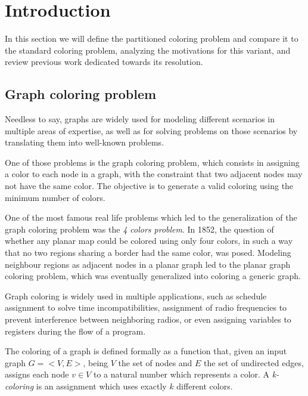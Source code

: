 
\section{Introduction}
\label{sec:introduction}

In this section we will define the partitioned coloring problem and compare it to the standard coloring problem, analyzing the motivations for this variant, and review previous work dedicated towards its resolution.

\subsection{Graph coloring problem}

Needless to say, graphs are widely used for modeling different scenarios in multiple areas of expertise, as well as for solving problems on those scenarios by translating them into well-known problems. 

One of those problems is the graph coloring problem, which consists in assigning a color to each node in a graph, with the constraint that two adjacent nodes may not have the same color. The objective is to generate a valid coloring using the minimum number of colors.

One of the most famous real life problems which led to the generalization of the graph coloring problem was the \textit{4 colors problem}. In 1852, the question of whether any planar map could be colored using only four colors, in such a way that no two regions sharing a border had the same color, was posed. Modeling neighbour regions as adjacent nodes in a planar graph led to the planar graph coloring problem, which was eventually generalized into coloring a generic graph.

Graph coloring is widely used in multiple applications, such as schedule assignment to solve time incompatibilities, assignment of radio frequencies to prevent interference between neighboring radios, or even assigning variables to registers during the flow of a program.

The coloring of a graph is defined formally as a function that, given an input graph $G = <V,E>$, being $V$ the set of nodes and $E$ the set of undirected edges, assigns each node $v \in V$ to a natural number which represents a color. A \textit{k-coloring} is an assignment which uses exactly $k$ different colors.

